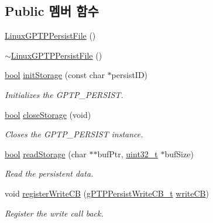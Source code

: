 \subsection*{Public 멤버 함수}
\begin{DoxyCompactItemize}
\item 
\hyperlink{class_linux_g_p_t_p_persist_file_ad75b0e46727335ec9a84659dd83d2f82}{Linux\+G\+P\+T\+P\+Persist\+File} ()
\item 
\hyperlink{class_linux_g_p_t_p_persist_file_a23ed1f1232358792e55d1eda8c6ea13e}{$\sim$\+Linux\+G\+P\+T\+P\+Persist\+File} ()
\item 
\hyperlink{avb__gptp_8h_af6a258d8f3ee5206d682d799316314b1}{bool} \hyperlink{class_linux_g_p_t_p_persist_file_af56cdac17e885d0127426865eab5cc00}{init\+Storage} (const char $\ast$persist\+ID)
\begin{DoxyCompactList}\small\item\em Initializes the G\+P\+T\+P\+\_\+\+P\+E\+R\+S\+I\+ST. \end{DoxyCompactList}\item 
\hyperlink{avb__gptp_8h_af6a258d8f3ee5206d682d799316314b1}{bool} \hyperlink{class_linux_g_p_t_p_persist_file_aa8f88fd0e42358e8778ac3976dcc277a}{close\+Storage} (void)
\begin{DoxyCompactList}\small\item\em Closes the G\+P\+T\+P\+\_\+\+P\+E\+R\+S\+I\+ST instance. \end{DoxyCompactList}\item 
\hyperlink{avb__gptp_8h_af6a258d8f3ee5206d682d799316314b1}{bool} \hyperlink{class_linux_g_p_t_p_persist_file_a1b1da8589008d673c6f4cce915bb3f1c}{read\+Storage} (char $\ast$$\ast$buf\+Ptr, \hyperlink{parse_8c_a6eb1e68cc391dd753bc8ce896dbb8315}{uint32\+\_\+t} $\ast$buf\+Size)
\begin{DoxyCompactList}\small\item\em Read the persistent data. \end{DoxyCompactList}\item 
void \hyperlink{class_linux_g_p_t_p_persist_file_a2afe60e7336516ae6cb5ca1164110669}{register\+Write\+CB} (\hyperlink{avbts__persist_8hpp_a79cbcb0be2bbb7984e94c586573cd5ba}{g\+P\+T\+P\+Persist\+Write\+C\+B\+\_\+t} \hyperlink{class_linux_g_p_t_p_persist_file_a914beb5a5d0085ceeea5f3f9f3143020}{write\+CB})
\begin{DoxyCompactList}\small\item\em Register the write call back. \end{DoxyCompactList}\item 
$$
\end{DoxyCompactItemize}
